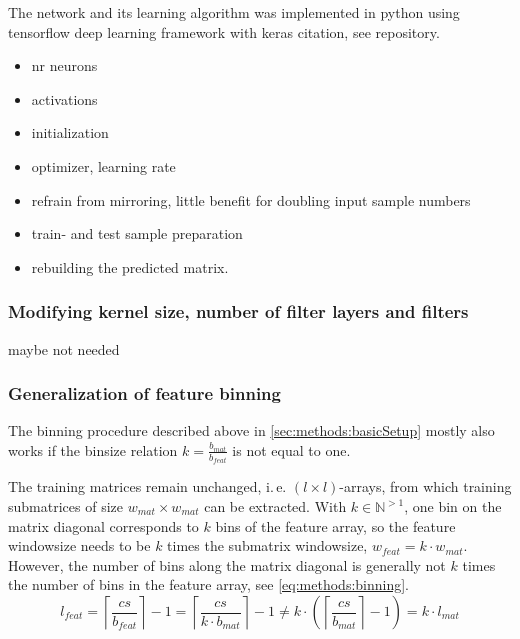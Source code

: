 The network and its learning algorithm was implemented in python using tensorflow deep learning framework with keras \xxx citation, see \xxx repository.




\begin{itemize}
 \item nr neurons
 \item activations
 \item initialization
 \item optimizer, learning rate
 \item refrain from mirroring, little benefit for doubling input sample numbers
 \item train- and test sample preparation
 \item rebuilding the predicted matrix.
\end{itemize}

\subsubsection{Modifying kernel size, number of filter layers and filters}
maybe not needed

\subsubsection{Generalization of feature binning} \label{sec:methods:inputBinning}
The binning procedure described above in \cref{sec:methods:basicSetup} mostly also works if the binsize relation $k=\frac{b_{mat}}{b_{feat}}$
is not equal to one.

The training matrices remain unchanged, i.\,e. $(l \times l)$-arrays, from which training submatrices of size  $w_{mat} \times w_{mat} $
can be extracted. 
With $k \in \mathbb{N}^{>1}$, one bin on the matrix diagonal corresponds to $k$ bins of the feature array,
so the feature windowsize needs to be $k$ times the submatrix windowsize, $w_{feat} = k \cdot w_{mat}$.
However, the number of bins along the matrix diagonal is generally not $k$ times the number of bins in the feature array,
see \cref{eq:methods:binning}.
\begin{equation}
 l_{feat} = \left \lceil{\frac{cs}{b_{feat}}}\right \rceil -1 
                = \left \lceil{\frac{cs}{k \cdot b_{mat}}}\right \rceil -1 
                \not = k \cdot (\left \lceil{\frac{cs}{ b_{mat}}}\right \rceil -1)
                = k \cdot l_{mat} \label{eq:methods:binning}
\end{equation}

